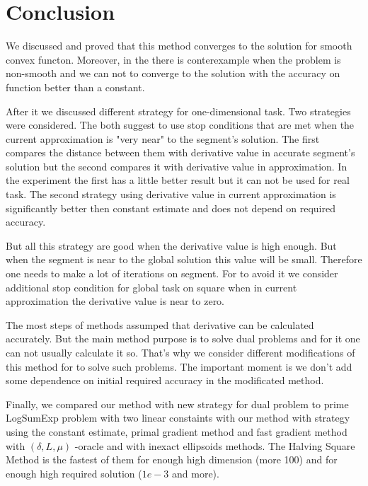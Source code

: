 \documentclass[12pt]{article}
\begin{document}
\section{Conclusion}

We discussed and proved that this method converges to the solution for smooth convex functon. Moreover, in the \cite{Ston_Pas} there is conterexample when the problem is non-smooth and we can not to converge to the solution with the accuracy on function better than a constant.

After it we discussed different strategy for one-dimensional task. Two strategies were considered. The both suggest to use stop conditions that are met when the current approximation is "very near" to the segment's solution. The first compares the distance between them with derivative value in accurate segment's solution but the second compares it with derivative value in approximation. In the experiment the first has a little better result but it can not be used for real task. The second strategy using derivative value in current approximation is significantly better then constant estimate and does not depend on required accuracy.

But all this strategy are good when the derivative value is high enough. But when the segment is near to the global solution this value will be small. Therefore one needs to make a lot of iterations on segment. For to avoid it we consider additional stop condition for global task on square when in current approximation the derivative value is near to zero.

The most steps of methods assumped that derivative can be calculated accurately. But the main method purpose is to solve dual problems and for it one can not usually calculate it so. That's why we consider different modifications of this method for to solve such problems. The important moment is we don't add some dependence on initial required accuracy in the modificated method.

Finally, we compared our method with new strategy for dual problem to prime LogSumExp problem with two linear constaints with our method with strategy using the constant estimate, primal gradient method and fast gradient method with $(\delta, L, \mu)$ -oracle and with inexact ellipsoids methods. The Halving Square Method is the fastest of them for enough high dimension (more 100) and for enough high required solution ($1e-3$ and more).
\end{document}
